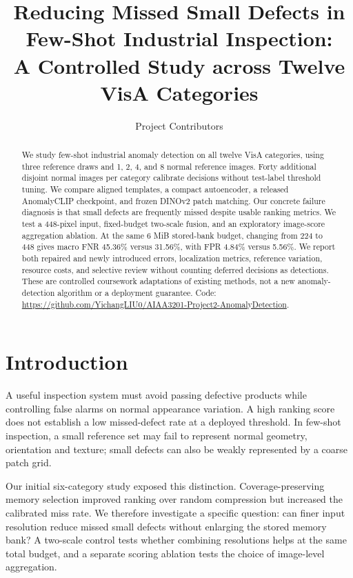 \documentclass[10pt,twocolumn,letterpaper]{article}
\title{Reducing Missed Small Defects in Few-Shot Industrial Inspection:\\A Controlled Study across Twelve VisA Categories}
\author{Project Contributors}
\begin{document}
\maketitle
\begingroup\renewcommand\thefootnote{}\endgroup
\begin{abstract}
We study few-shot industrial anomaly detection on all twelve VisA categories, using three reference draws and 1, 2, 4, and 8 normal reference images. Forty additional disjoint normal images per category calibrate decisions without test-label threshold tuning. We compare aligned templates, a compact autoencoder, a released AnomalyCLIP checkpoint, and frozen DINOv2 patch matching. Our concrete failure diagnosis is that small defects are frequently missed despite usable ranking metrics. We test a 448-pixel input, fixed-budget two-scale fusion, and an exploratory image-score aggregation ablation. At the same 6 MiB stored-bank budget, changing from 224 to 448 gives macro FNR 45.36\% versus 31.56\%, with FPR 4.84\% versus 5.56\%. We report both repaired and newly introduced errors, localization metrics, reference variation, resource costs, and selective review without counting deferred decisions as detections. These are controlled coursework adaptations of existing methods, not a new anomaly-detection algorithm or a deployment guarantee. Code: \url{https://github.com/YichangLIU0/AIAA3201-Project2-AnomalyDetection}.
\end{abstract}
\section{Introduction}
A useful inspection system must avoid passing defective products while controlling false alarms on normal appearance variation. A high ranking score does not establish a low missed-defect rate at a deployed threshold. In few-shot inspection, a small reference set may fail to represent normal geometry, orientation and texture; small defects can also be weakly represented by a coarse patch grid.

Our initial six-category study exposed this distinction. Coverage-preserving memory selection improved ranking over random compression but increased the calibrated miss rate. We therefore investigate a specific question: can finer input resolution reduce missed small defects without enlarging the stored memory bank? A two-scale control tests whether combining resolutions helps at the same total budget, and a separate scoring ablation tests the choice of image-level aggregation.
\end{document}
